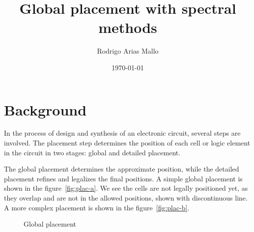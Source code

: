\documentclass[a4paper,twocolumn]{article}
\title{Global placement with spectral methods}
\author{Rodrigo Arias Mallo}
\date{\today}
\begin{document}
\maketitle
%

\section{Background}
In the process of design and synthesis of an electronic circuit, several steps 
are involved. The placement step determines the position of each cell or logic 
element in the circuit in two stages: global and detailed placement.

The global placement determines the approximate position, while the detailed 
placement refines and legalizes the final positions. A simple global placement 
is shown in the figure~\ref{fig:plac-a}. We see the cells are not legally 
positioned yet, as they overlap and are not in the allowed positions, shown with 
discontinuous line. A more complex placement is shown in the 
figure~\ref{fig:plac-b}.
%
\begin{figure}[h]
	\centering
	\caption{Global placement}
	\label{fig:plac}
\end{figure}
\end{document}
